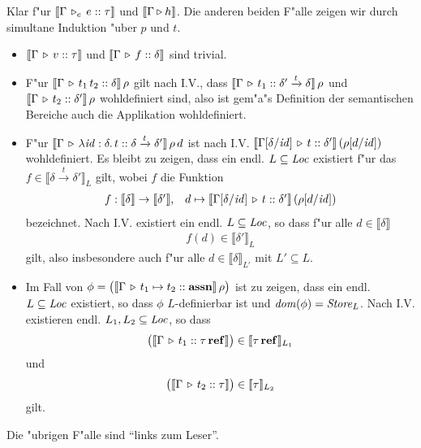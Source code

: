 \documentclass[12pt,a4paper,bigheadings]{scrartcl}
\newcommand{\semantic}[1]{\ensuremath{\llbracket#1\rrbracket}}
\newcommand{\assn}{\ensuremath{\mathbf{assn}}}
\newcommand{\tto}{\ensuremath{\xrightarrow{t}}}
\newcommand{\Tje}[3]{#1 \,\tr_e\, #2\cc#3}
\begin{document}
\begin{beweis}
  Klar f"ur $\semantic{\Tje{\Gamma}{e}{\tau}}$ und $\semantic{\Tjh{\Gamma}{h}}$. Die anderen beiden
  F"alle zeigen wir durch simultane Induktion "uber $p$ und $t$.
  \begin{itemize}
    \item $\semantic{\Tj{\Gamma}{v}{\tau}}$ und $\semantic{\Tj{\Gamma}{f}{\delta}}$ sind trivial.

    \item F"ur $\semantic{\Tj{\Gamma}{\app{t_1}{t_2}}{\delta}}\,\rho$ gilt nach I.V., dass
          $\semantic{\Tj{\Gamma}{t_1}{\delta'\tto\delta}}\,\rho$ und
          $\semantic{\Tj{\Gamma}{t_2}{\delta'}}\,\rho$ wohldefiniert sind, also ist gem"a"s
          Definition der semantischen Bereiche auch die Applikation wohldefiniert.

    \item F"ur $\semantic{\Tj{\Gamma}{\abstr{\id:\delta}{t}}{\delta\tto\delta'}}\,\rho\,d$ ist nach I.V.
          $\semantic{\Tj{\Gamma[\delta/\id]}{t}{\delta'}}\,(\rho[d/\id])$ wohldefiniert. Es bleibt zu
          zeigen, dass ein endl. $L\subseteq{\text{\it Loc\/}}$ existiert f"ur das $f\in\semantic{\delta\tto\delta'}_L$ gilt,
          wobei $f$ die Funktion
          \[\begin{array}{rl}
            f: \semantic{\delta} \to \semantic{\delta'}, & d \mapsto
            \semantic{\Tj{\Gamma[\delta/\id]}{t}{\delta'}}\,(\rho[d/\id])
          \end{array}\]
          bezeichnet. Nach I.V. existiert ein endl. $L\subseteq{\text{\it Loc\/}}$, so dass f"ur alle $d\in\semantic{\delta}$
          \[\begin{array}{c}
            f(d) \in \semantic{\delta'}_L
          \end{array}\]
          gilt, also insbesondere auch f"ur alle $d\in\semantic{\delta}_{L'}$ mit $L'\subseteq L$.

    \item Im Fall von $\phi = \bigl(\semantic{\Tj{\Gamma}{t_1\mapsto t_2}{\assn}}\,\rho\bigr)$ ist zu zeigen,
          dass ein endl. $L\subseteq{\text{\it Loc\/}}$ existiert, so dass $\phi$ $L$-definierbar ist und ${\text{\it dom\/}}(\phi)={\text{\it Store\/}}_L$.
          Nach I.V. existieren endl. $L_1,L_2\subseteq{\text{\it Loc\/}}$, so dass
          \[\begin{array}{c}
            \bigl(\semantic{\Tj{\Gamma}{t_1}{\reftype{\tau}}}\bigr) \in \semantic{\reftype{\tau}}_{L_1}
          \end{array}\]
          und
          \[\begin{array}{c}
            \bigl(\semantic{\Tj{\Gamma}{t_2}{\tau}}\bigr) \in \semantic{\tau}_{L_2}
          \end{array}\]
          gilt.
  \end{itemize}
  Die "ubrigen F"alle sind "`links zum Leser"'.
\end{beweis}
\end{document}
